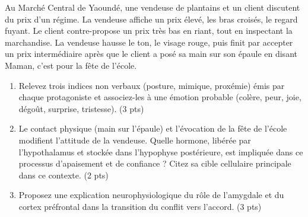 \documentclass[11pt]{article}
\begin{document}
\begin{exercice}
\label{exo:marche}
Au Marché Central de Yaoundé, une vendeuse de plantains et un client discutent du prix d'un régime. La vendeuse affiche un prix élevé, les bras croisés, le regard fuyant. Le client contre-propose un prix très bas en riant, tout en inspectant la marchandise. La vendeuse hausse le ton, le visage rouge, puis finit par accepter un prix intermédiaire après que le client a posé sa main sur son épaule en disant \og\thinspace{}Maman, c'est pour la fête de l'école\thinspace{}\fg{}.
\begin{enumerate}
    \item Relevez trois indices non verbaux (posture, mimique, proxémie) émis par chaque protagoniste et associez-les à une émotion probable (colère, peur, joie, dégoût, surprise, tristesse). \hfill (3 pts)
    \item Le contact physique (main sur l'épaule) et l'évocation de la \og\thinspace{}fête de l'école\thinspace{}\fg{} modifient l'attitude de la vendeuse. Quelle hormone, libérée par l'hypothalamus et stockée dans l'hypophyse postérieure, est impliquée dans ce processus d'apaisement et de confiance ? Citez sa cible cellulaire principale dans ce contexte. \hfill (2 pts)
    \item Proposez une explication neurophysiologique du rôle de l'amygdale et du cortex préfrontal dans la transition du conflit vers l'accord. \hfill (3 pts)
\end{enumerate}
\end{exercice}
\end{document}
